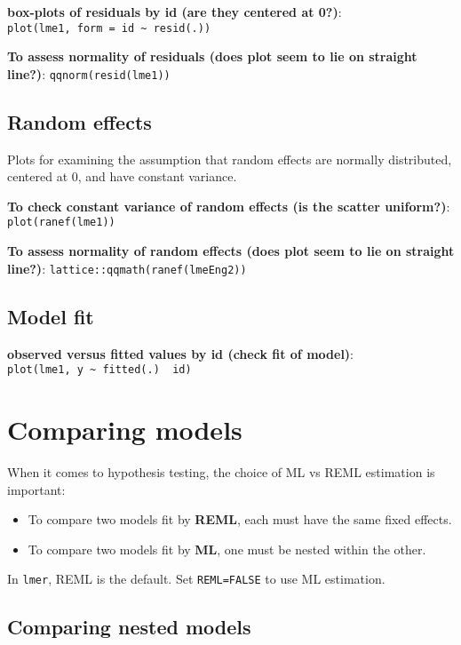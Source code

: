 \documentclass[
]{article}
\providecommand{\tightlist}{%
  \setlength{\itemsep}{0pt}\setlength{\parskip}{0pt}}
\begin{document}
\textbf{box-plots of residuals by id (are they centered at 0?)}:
\texttt{plot(lme1,\ form\ =\ id\ \textasciitilde{}\ resid(.))}

\textbf{To assess normality of residuals (does plot seem to lie on
straight line?)}: \texttt{qqnorm(resid(lme1))}

\subsection{Random effects}\label{random-effects}

Plots for examining the assumption that random effects are normally
distributed, centered at 0, and have constant variance.

\textbf{To check constant variance of random effects (is the scatter
uniform?)}: \texttt{plot(ranef(lme1))}

\textbf{To assess normality of random effects (does plot seem to lie on
straight line?)}: \texttt{lattice::qqmath(ranef(lmeEng2))}

\subsection{Model fit}\label{model-fit}

\textbf{observed versus fitted values by id (check fit of model)}:
\texttt{plot(lme1,\ y\ \textasciitilde{}\ fitted(.)\ \textbar{}\ id)}

\section{Comparing models}\label{comparing-models}

When it comes to hypothesis testing, the choice of ML vs REML estimation
is important:

\begin{itemize}
\tightlist
\item
  To compare two models fit by \textbf{REML}, each must have the same
  fixed effects.
\item
  To compare two models fit by \textbf{ML}, one must be nested within
  the other.
\end{itemize}

In \texttt{lmer}, REML is the default. Set \texttt{REML=FALSE} to use ML
estimation.

\subsection{Comparing nested models}\label{comparing-nested-models}
\end{document}
